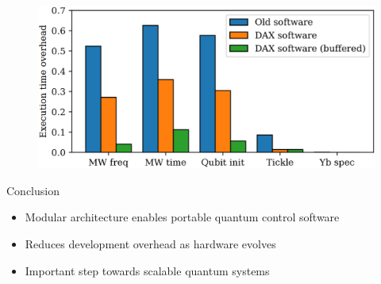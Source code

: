 \documentclass[18 pt]{beamer}
\begin{document}
\begin{frame}
  \begin{figure}
    \includegraphics[width=.8\textwidth]{time.png}
  \end{figure}
\end{frame}

\begin{frame}{Conclusion}
\begin{itemize}
\item Modular architecture enables portable quantum control software
\item Reduces development overhead as hardware evolves
\item Important step towards scalable quantum systems
\end{itemize}

\end{frame}
\end{document}
